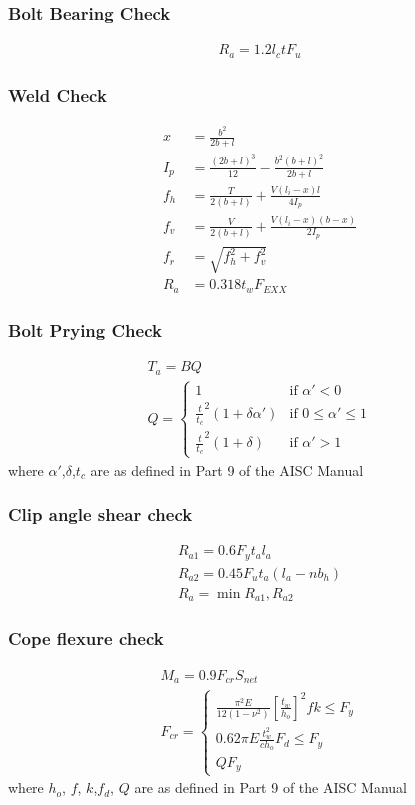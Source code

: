 \subsubsection{Bolt Bearing Check}
\begin{align}
    R_a = 1.2 l_c t F_u 
\end{align}
\subsubsection{Weld Check}
\begin{align}
    x &= \frac{b^2}{2 b + l} \\
    I_p &= \frac{(2 b + l)^3}{12} - \frac{b^2(b + l)^2}{2 b + l} \\
    f_h &= \frac{T}{2(b + l)} + \frac{V (l_i - x) l}{4 I_p} \\
    f_v &= \frac{V}{2(b + l)} + \frac{V (l_i - x)(b - x)}{2 I_p} \\
    f_r &= \sqrt{f_h^2 + f_v^2} \\    
    R_a &= 0.318 t_w F_{EXX}
\end{align}
\subsubsection {Bolt Prying Check}
\begin{gather}
    T_a = B Q \\
    Q = \begin{cases}
        1 &\text {if \(\alpha' < 0\)}\\
        \frac{t}{t_c}^2 (1 + \delta \alpha') &\text {if \(0 \le \alpha' \le 1\)}\\
        \frac{t}{t_c}^2 (1 + \delta) &\text {if \(\alpha' > 1\)}
    \end{cases}
\end{gather}
where \(\alpha'\),\(\delta\),\(t_c\) are as defined in Part 9 of the AISC Manual
\subsubsection{Clip angle shear check}
\begin{gather}
    R_{a1} = 0.6 F_y t_a l_a \\
    R_{a2} = 0.45 F_u t_a (l_a - n b_h) \\ 
    R_a = \min{R_{a1},R_{a2}}
\end{gather}

\subsubsection{Cope flexure check}
\begin{gather}
    M_a = 0.9 F_{cr} S_{net} \\
    F_{cr} = \begin{cases} 
        \frac{\pi^2 E}{12(1-\nu^2)} [\frac{t_w}{h_o}]^2 fk \le F_y \\
        0.62 \pi E \frac{t_w^2}{c h_o} F_d \le F_y \\
        Q F_y
    \end{cases}
\end{gather}
where \(h_o\), \(f\), \(k\),\(f_d\), \(Q\) are as defined in Part 9 of the AISC Manual

